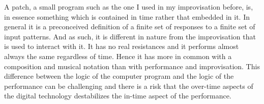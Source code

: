 \documentclass{article}
\begin{document}
A patch, a small program such as the one I used in my improvisation before, is, in essence something which is contained in time rather that embedded in it. In general it is a preconceived definition of a finite set of responses to a finite set of input patterns. And as such, it is different in nature from the improvisation that is used to interact with it. It has no real resistances and it performs almost always the same regardless of time. Hence it has more in common with a composition and musical notation than with performance and improvisation. This difference between the logic of the computer program and the logic of the performance can be challenging and there is a risk that the over-time aspects of the digital technology destabilizes the in-time aspect of the performance.





\end{document}

